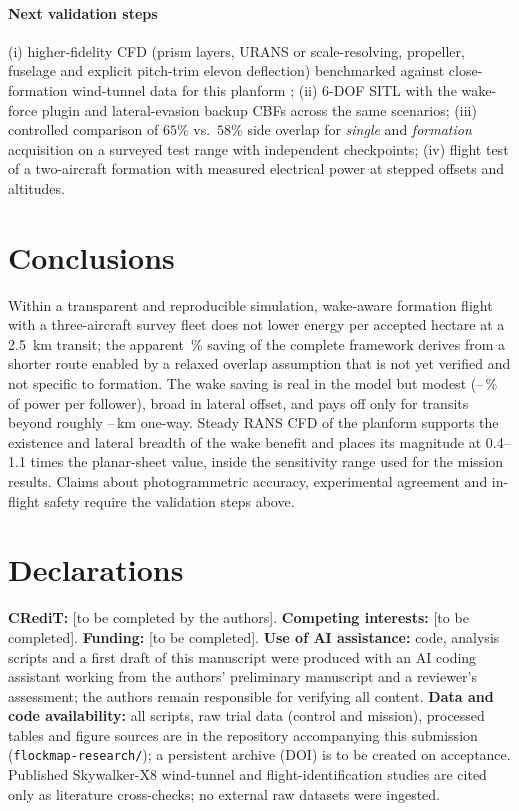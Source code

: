 \documentclass[preprint,12pt]{elsarticle}
\begin{document}
\paragraph{Next validation steps} (i) higher-fidelity CFD (prism layers, URANS or scale-resolving, propeller, fuselage and explicit pitch-trim elevon deflection) benchmarked against close-formation wind-tunnel data for this planform \cite{gryte2018}; (ii) 6-DOF SITL with the wake-force plugin and lateral-evasion backup CBFs \cite{chen2021backup,molnar2025} across the same scenarios; (iii) controlled comparison of $65\%$ vs.\ $58\%$ side overlap for \emph{single} and \emph{formation} acquisition on a surveyed test range with independent checkpoints; (iv) flight test of a two-aircraft formation with measured electrical power at stepped offsets and altitudes.

\section{Conclusions}
Within a transparent and reproducible simulation, wake-aware formation flight with a three-aircraft survey fleet does not lower energy per accepted hectare at a \SI{2.5}{km} transit; the apparent \nabsASheet\,\% saving of the complete framework derives from a shorter route enabled by a relaxed overlap assumption that is not yet verified and not specific to formation. The wake saving is real in the model but modest (\npeakFree--\npeakSheet\,\% of power per follower), broad in lateral offset, and pays off only for transits beyond roughly \nbeSevSheet--\nbeSevFree\,km one-way. Steady RANS CFD of the planform supports the existence and lateral breadth of the wake benefit and places its magnitude at 0.4--1.1 times the planar-sheet value, inside the sensitivity range used for the mission results. Claims about photogrammetric accuracy, experimental agreement and in-flight safety require the validation steps above.

\section*{Declarations}
\textbf{CRediT:} [to be completed by the authors]. \textbf{Competing interests:} [to be completed]. \textbf{Funding:} [to be completed]. \textbf{Use of AI assistance:} code, analysis scripts and a first draft of this manuscript were produced with an AI coding assistant working from the authors' preliminary manuscript and a reviewer's assessment; the authors remain responsible for verifying all content. \textbf{Data and code availability:} all scripts, raw trial data (control and mission), processed tables and figure sources are in the repository accompanying this submission (\texttt{flockmap-research/}); a persistent archive (DOI) is to be created on acceptance. Published Skywalker-X8 wind-tunnel and flight-identification studies \cite{gryte2018,reinhardt2022} are cited only as literature cross-checks; no external raw datasets were ingested.
\end{document}

